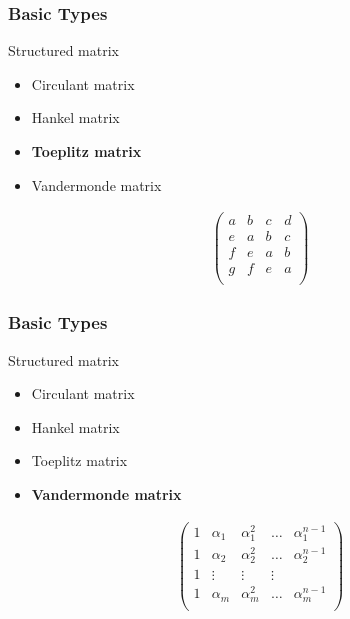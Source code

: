 \begin{frame}
\frametitle{Basic Types}

\begin{block}{Structured matrix}
  \begin{itemize}
   \item Circulant matrix
   \item Hankel matrix
   \item \textbf{Toeplitz matrix}
   \item Vandermonde matrix
  \end{itemize}
\end{block}

\begin{align*}
 \left( \begin{array}{cccc}
         a & b & c & d \\
         e & a & b & c \\
         f & e & a & b \\
         g & f & e & a \\
        \end{array} \right)
\end{align*}

\vspace{0.9cm}

\end{frame}



\begin{frame}
\frametitle{Basic Types}

\begin{block}{Structured matrix}
  \begin{itemize}
   \item Circulant matrix
   \item Hankel matrix
   \item Toeplitz matrix
   \item \textbf{Vandermonde matrix}
  \end{itemize}
\end{block}

\begin{align*}
 \left( \begin{array}{ccccc}
         1 & \alpha_1 & \alpha_1^2 & \ldots & \alpha_1^{n-1} \\
         1 & \alpha_2 & \alpha_2^2 & \ldots & \alpha_2^{n-1} \\
         1 & \vdots & \vdots & \vdots \\
         1 & \alpha_m & \alpha_m^2 & \ldots & \alpha_m^{n-1} \\
        \end{array} \right)
\end{align*}

\vspace{0.6cm}

\end{frame}













